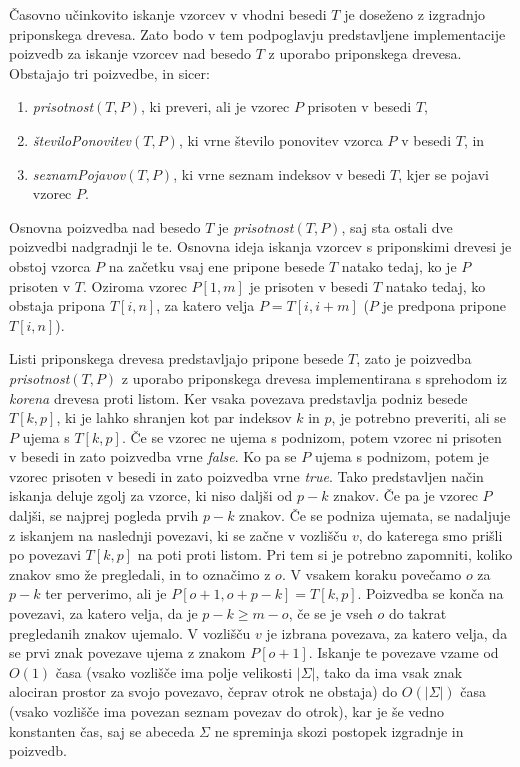 Časovno učinkovito iskanje vzorcev v vhodni besedi $T$ je doseženo z izgradnjo priponskega drevesa. Zato bodo v tem podpoglavju predstavljene implementacije poizvedb za iskanje vzorcev nad besedo $T$ z uporabo priponskega drevesa. Obstajajo tri poizvedbe, in sicer:
\newpage
\begin{enumerate}
    \item \textit{prisotnost}$(T,P)$, ki preveri, ali je vzorec $P$ prisoten v besedi $T$,
    \item \textit{številoPonovitev}$(T,P)$, ki vrne število ponovitev vzorca $P$ v besedi $T$, in
    \item \textit{seznamPojavov}$(T,P)$, ki vrne seznam indeksov v besedi $T$, kjer se pojavi vzorec $P$.
\end{enumerate}

Osnovna poizvedba nad besedo $T$ je \textit{prisotnost}$(T,P)$, saj sta ostali dve poizvedbi nadgradnji le te. Osnovna ideja iskanja vzorcev s priponskimi drevesi je obstoj vzorca $P$ na začetku vsaj ene pripone besede $T$ natako tedaj, ko je $P$ prisoten v $T$. Oziroma vzorec $P[1,m]$ je prisoten v besedi $T$ natako tedaj, ko obstaja pripona $T[i,n]$, za katero velja $P=T[i,i+m]$ ($P$ je predpona pripone $T[i,n]$). 

Listi priponskega drevesa predstavljajo pripone besede $T$, zato je poizvedba \textit{prisotnost}$(T,P)$ z uporabo priponskega drevesa implementirana s sprehodom iz \textit{korena} drevesa proti listom. Ker vsaka povezava predstavlja podniz besede $T[k,p]$, ki je lahko shranjen kot par indeksov $k$ in $p$, je potrebno preveriti, ali se $P$ ujema s $T[k,p]$. Če se vzorec ne ujema s podnizom, potem vzorec ni prisoten v besedi in zato poizvedba vrne \textit{false}. Ko pa se $P$ ujema s podnizom, potem je vzorec prisoten v besedi in zato poizvedba vrne \textit{true}. Tako predstavljen način iskanja deluje zgolj za vzorce, ki niso daljši od $p-k$ znakov. Če pa je vzorec $P$ daljši, se najprej pogleda prvih $p-k$ znakov. Če se podniza ujemata, se nadaljuje z iskanjem na naslednji povezavi, ki se začne v vozlišču $v$, do katerega smo prišli po povezavi $T[k,p]$ na poti proti listom. Pri tem si je potrebno zapomniti, koliko znakov smo že pregledali, in to označimo z $o$. V vsakem koraku povečamo $o$ za $p-k$ ter perverimo, ali je $P[o+1,o+p-k]=T[k,p]$. Poizvedba se konča na povezavi, za katero velja, da je $p-k\ge m-o$, če se je vseh $o$ do takrat pregledanih znakov ujemalo. V vozlišču $v$ je izbrana povezava, za katero velja, da se prvi znak povezave ujema z znakom $P[o+1]$. Iskanje te povezave vzame od $O(1)$ časa (vsako vozlišče ima polje velikosti $|\Sigma|$, tako da ima vsak znak alociran prostor za svojo povezavo, čeprav otrok ne obstaja) do $O(|\Sigma|)$ časa (vsako vozlišče ima povezan seznam povezav do otrok), kar je še vedno konstanten čas, saj se abeceda $\Sigma$ ne spreminja skozi postopek izgradnje in poizvedb.

